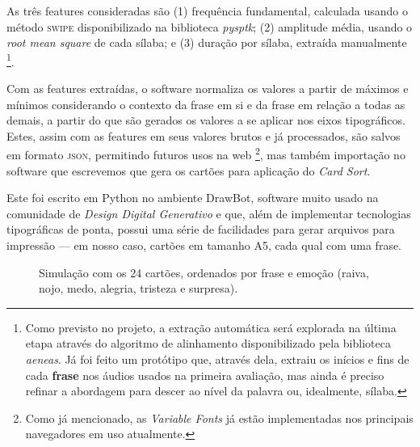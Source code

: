 \documentclass[a4paper,11pt,titlepage,singlespacing]{article}
\let\svthefootnote\thefootnote
\newcommand\Cfootnote[2][black]{\def\thefootnote{\color{#1}\svthefootnote}%
  \footnote{\color{#1}#2}}
\begin{document}
{    As três features consideradas são (1) frequência fundamental, calculada usando o método \textsc{swipe} disponibilizado na biblioteca \textit{pysptk}; (2) amplitude média, usando o \textit{root mean square} de cada sílaba; e (3) duração por sílaba, extraída manualmente\Cfootnote[pos_parecer]{Como previsto no projeto, a extração automática será explorada na última etapa através do algoritmo de alinhamento disponibilizado pela biblioteca \textit{aeneas}. Já foi feito um protótipo que, através dela, extraiu os inícios e fins de cada \textbf{frase} nos áudios usados na primeira avaliação, mas ainda é preciso refinar a abordagem para descer ao nível da palavra ou, idealmente, sílaba.}.
    
    Com as features extraídas, o software normaliza os valores a partir de máximos e mínimos considerando o contexto da frase em si e da frase em relação a todas as demais, a partir do que são gerados os valores a se aplicar nos eixos tipográficos. Estes, assim com as features em seus valores brutos e já processados, são salvos em formato \textsc{json}, permitindo futuros usos na web\Cfootnote[pos_parecer]{Como já mencionado, as \textit{Variable Fonts} já estão implementadas nos principais navegadores em uso atualmente.}, mas também importação no software que escrevemos que gera os cartões para aplicação do \textit{Card Sort}.
    
    Este foi escrito em Python no ambiente DrawBot, software muito usado na comunidade de \textit{Design Digital Generativo} e que, além de implementar tecnologias tipográficas de ponta, possui uma série de facilidades para gerar arquivos para impressão — em nosso caso, cartões em tamanho A5, cada qual com uma frase.
    
    
    \begin{figure}
        \caption{Simulação com os 24 cartões, ordenados por frase e emoção (raiva, nojo, medo, alegria, tristeza e surpresa).}
        \label{fig:key}
    \end{figure}
    
    
}




\pagebreak


\end{document}
